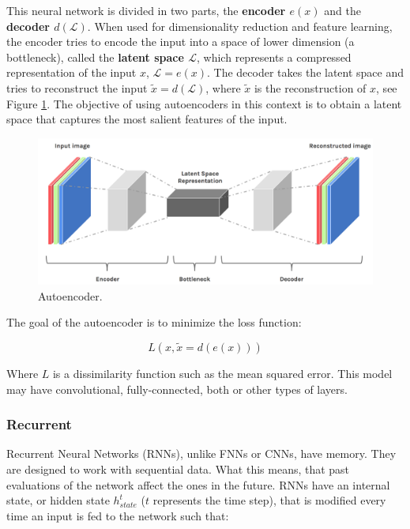 This neural network is divided in two parts, the \textbf{encoder $e(x)$} and the \textbf{decoder $d(\mathcal{L})$}. When used for dimensionality reduction and feature learning, the encoder tries to encode the input into a space of lower dimension (a bottleneck), called the \textbf{latent space $\mathcal{L}$}, which represents a compressed representation of the input $x$, $\mathcal{L}=e(x)$. The decoder takes the latent space and tries to reconstruct the input $\widetilde x = d(\mathcal{L})$, where $\widetilde x$ is the reconstruction of $x$, see Figure \ref{fig:ae}. The objective of using autoencoders in this context is to obtain a latent space that captures the most salient features of the input. 
    
\begin{figure}[H]
    \centering
    \includegraphics[width=0.8\linewidth]{imagenes/cap1/ae.png}
    \caption{Autoencoder.\protect\footnotemark}
    \label{fig:ae}
\end{figure}
    
The goal of the autoencoder is to minimize the loss function:

\begin{equation}
\label{eq:ae}
    L(x, \widetilde x = d(e(x)))
\end{equation}

Where $L$ is a dissimilarity function such as the mean squared error. This model may have convolutional, fully-connected, both or other types of layers.

\subsubsection{Recurrent}
    
Recurrent Neural Networks (RNNs), unlike FNNs or CNNs, have memory. They are designed to work with sequential data. What this means, that past evaluations of the network affect the ones in the future. RNNs have an internal state, or hidden state $h_{state}^{t}$ ($t$ represents the time step), that is modified every time an input is fed to the network such that:


